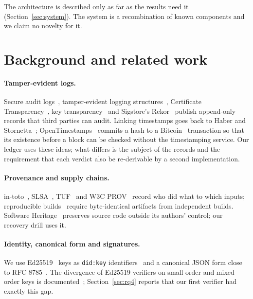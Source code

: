 \documentclass[11pt,a4paper]{article}
\newcommand{\code}[1]{\texttt{#1}}
\begin{document}
The architecture is described only as far as the results need it (Section~\ref{sec:system}). The system is a recombination of known components and we claim no novelty for it.

\section{Background and related work}\label{sec:related}

\paragraph{Tamper-evident logs.} Secure audit logs~\citep{schneier1999}, tamper-evident logging structures~\citep{crosby2009}, Certificate Transparency~\citep{rfc6962}, key transparency~\citep{coniks} and Sigstore's Rekor~\citep{sigstore} publish append-only records that third parties can audit. Linking timestamps goes back to Haber and Stornetta~\citep{haber1991}; OpenTimestamps~\citep{ots} commits a hash to a Bitcoin~\citep{nakamoto2008} transaction so that its existence before a block can be checked without the timestamping service. Our ledger uses these ideas; what differs is the subject of the records and the requirement that each verdict also be re-derivable by a second implementation.

\paragraph{Provenance and supply chains.} in-toto~\citep{intoto}, SLSA~\citep{slsa}, TUF~\citep{tuf} and W3C PROV~\citep{prov} record who did what to which inputs; reproducible builds~\citep{lamb2022} require byte-identical artifacts from independent builds. Software Heritage~\citep{swh} preserves source code outside its authors' control; our recovery drill uses it.

\paragraph{Identity, canonical form and signatures.} We use Ed25519~\citep{bernstein2012,rfc8032} keys as \code{did:key} identifiers~\citep{didcore,didkey} and a canonical JSON form close to RFC 8785~\citep{rfc8785}. The divergence of Ed25519 verifiers on small-order and mixed-order keys is documented~\citep{chalkias2020,brendel2021}; Section~\ref{sec:rq4} reports that our first verifier had exactly this gap.
\end{document}
